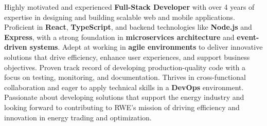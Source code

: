 
\space
Highly motivated and experienced \textbf{Full-Stack Developer} with over 4 years of expertise in designing and building scalable web and mobile applications. Proficient in \textbf{React}, \textbf{TypeScript}, and backend technologies like \textbf{Node.js} and \textbf{Express}, with a strong foundation in \textbf{microservices architecture} and \textbf{event-driven systems}. Adept at working in \textbf{agile environments} to deliver innovative solutions that drive efficiency, enhance user experiences, and support business objectives. Proven track record of developing production-quality code with a focus on testing, monitoring, and documentation. Thrives in cross-functional collaboration and eager to apply technical skills in a \textbf{DevOps} environment. Passionate about developing solutions that support the energy industry and looking forward to contributing to RWE's mission of driving efficiency and innovation in energy trading and optimization.
